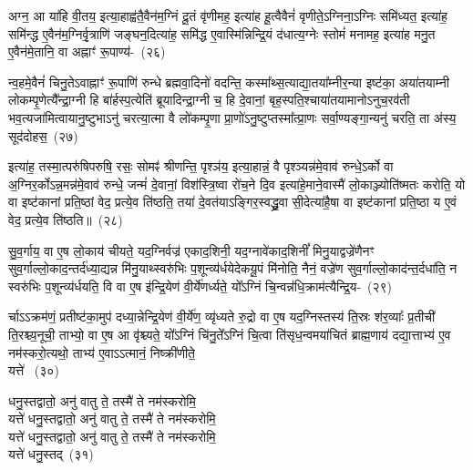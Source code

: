 {\anuvakamend[{ब्र॒ह्म॒वा॒दिनो॒ व्य॑न्यादे॒षु यज॑मान॒स्त्रीणि॑ च}]}

अग्न॒ आ या॑हि वी॒तय॒ इत्या॒हाह्व॑तै॒वैन॑म॒ग्निं दू॒तं वृ॑णीमह॒ इत्या॑ह हू॒त्वैवैनं॑ वृणीते॒\-ऽग्निना॒\-ऽग्निः समि॑ध्यत॒ इत्या॑ह॒ समि॑न्द्ध ए॒वैन॑म॒ग्निर्वृ॒त्राणि॑ जङ्घन॒दित्या॑ह॒ समि॑द्ध ए॒वास्मि॑न्निन्द्रि॒यं द॑धात्य॒ग्नेः स्तोमं॑ मनामह॒ इत्या॑ह मनु॒त ए॒वैन॑मे॒तानि॒ वा अह्नाꣳ॑ रू॒पाण्य॑-~(२६)\ip

न्व॒हमे॒वैनं॑ चिनु॒ते\-ऽवाह्नाꣳ॑ रू॒पाणि॑ रुन्धे ब्रह्मवा॒दिनो॑ वदन्ति॒ कस्मा᳚थ्स॒त्याद्या॒त\-या᳚म्नीर॒न्या इष्ट॑का॒ अया॑तयाम्नी लोकम्पृ॒णेत्यै᳚न्द्रा॒ग्नी हि बा॑र्\mbox{}हस्प॒त्येति॑ ब्रूयादिन्द्रा॒ग्नी च॒ हि दे॒वानां॒ बृह॒स्पति॒श्चाया॑तयामानो\-ऽनुच॒रव॑ती भव॒त्यजा॑मित्वायानु॒ष्टुभा\-ऽनु॑ चरत्या॒त्मा वै लो॑कम्पृ॒णा प्रा॒णो॑\-ऽनु॒ष्टुप्तस्मा᳚त्प्रा॒णः सर्वा॒ण्यङ्गा॒न्यनु॑ चरति॒ ता अ॑स्य॒ सूद॑दोहस॒~(२७)\ip

इत्या॑ह॒ तस्मा॒त्परु॑षिपरुषि॒ रसः॒ सोमꣴ॑ श्रीणन्ति॒ पृश्ञ॑य॒ इत्या॒हान्नं॒ वै पृश्ञ्यन्न॑मे॒वाव॑ रुन्धे॒\-ऽर्को वा अ॒ग्निर॒र्को\-ऽन्न॒मन्न॑मे॒वाव॑ रुन्धे॒ जन्मं॑ दे॒वानां॒ विश॑स्त्रि॒ष्वा रो॑च॒ने दि॒व इत्या॑हे॒माने॒वास्मै॑ लो॒काञ्ज्योति॑ष्मतः करोति॒ यो वा इष्ट॑कानां प्रति॒ष्ठां वेद॒ प्रत्ये॒व ति॑ष्ठति॒ तया॑ दे॒वत॑या\-ऽ\-ङ्गिर॒स्वद्ध्रु॒वा सी॒देत्या॑है॒षा वा इष्ट॑कानां प्रति॒ष्ठा य ए॒वं वेद॒ प्रत्ये॒व ति॑ष्ठति॥~(२८)\ip

{\anuvakamend[{रू॒पाणि॒ सूद॑दोहस॒स्तया॒ षोड॑श च}]}

सु॒व॒र्गाय॒ वा ए॒ष लो॒काय॑ चीयते॒ यद॒ग्निर्वज्र॑ एकाद॒शिनी॒ यद॒ग्नावे॑काद॒शिनीं᳚ मिनु॒याद्वज्रे॑णैनꣳ सुव॒र्गाल्लो॒का\-द॒न्तर्द॑ध्या॒द्यन्न मि॑नु॒याथ्स्वरु॑भिः प॒शून्व्य॑र्धयेदेकयू॒पं मि॑नोति॒ नैनं॒ वज्रे॑ण सुव॒र्गाल्लो॒काद॑न्त॒र्दधा॑ति॒ न स्वरु॑भिः प॒शून्व्य॑र्धयति॒ वि वा ए॒ष इ॑न्द्रि॒येण॑ वी॒र्ये॑णर्ध्यते॒ यो᳚\-ऽग्निं चि॒न्वन्न॑धि॒क्राम॑त्यैन्द्रि॒य-~(२९)\ip

र्चा\-ऽऽक्रम॑णं॒ प्रतीष्ट॑का॒मुप॑ दध्या॒न्नेन्द्रि॒येण॑ वी॒र्ये॑ण॒ व्यृ॑ध्यते रु॒द्रो वा ए॒ष यद॒ग्निस्तस्य॑ ति॒स्रः श॑र॒व्याः᳚ प्र॒तीची॑ ति॒रश्च्य॒नूची॒ ताभ्यो॒ वा ए॒ष आ वृ॑श्च्यते॒ यो᳚\-ऽग्निं चि॑नु॒ते᳚\-ऽग्निं चि॒त्वा ति॑सृध॒न्वमया॑चितं ब्राह्म॒णाय॑ दद्या॒त्ताभ्य॑ ए॒व नम॑स्करो॒त्यथो॒ ताभ्य॑ ए॒वा\-ऽऽत्मानं॒ निष्क्री॑णीते॒\\यत्ते॑ ~(३०)\ip

धनु॒स्तद्वातो॒ अनु॑ वातु ते॒ तस्मै॑ ते  नम॑स्करोमि॒\\यत्ते॑  धनु॒स्तद्वातो॒ अनु॑ वातु ते॒ तस्मै॑ ते  नम॑स्करोमि॒\\यत्ते॑  धनु॒स्तद्वातो॒ अनु॑ वातु ते॒ तस्मै॑ ते  नम॑स्करोमि॒\\यत्ते॑  धनु॒स्तद्~(३१)\ip

